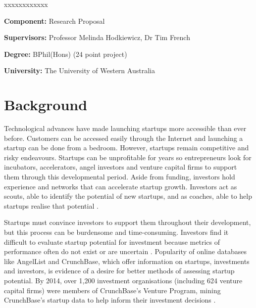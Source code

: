 \documentclass[../thesis/thesis.tex]{subfiles}
\begin{document}

\begin{namelist}{xxxxxxxxxxxx}
\item[{\bf Component:}]
    Research Proposal
\item[{\bf Supervisors:}]
    Professor Melinda Hodkiewicz, Dr Tim French
\item[{\bf Degree:}]
    BPhil(Hons) (24 point project)
\item[{\bf University:}]
    The University of Western Australia
\end{namelist}

\section*{Background}

Technological advances have made launching startups more accessible than ever before. Customers can be accessed easily through the Internet and launching a startup can be done from a bedroom. However, startups remain competitive and risky endeavours. Startups can be unprofitable for years so entrepreneurs look for incubators, accelerators, angel investors and venture capital firms to support them through this developmental period. Aside from funding, investors hold experience and networks that can accelerate startup growth. Investors act as scouts, able to identify the potential of new startups, and as coaches, able to help startups realise that potential \cite{baum2004}.

Startups must convince investors to support them throughout their development, but this process can be burdensome and time-consuming. Investors find it difficult to evaluate startup potential for investment because metrics of performance often do not exist or are uncertain \cite{shane2002}. Popularity of online databases like AngelList and CrunchBase, which offer information on startups, investments and investors, is evidence of a desire for better methods of assessing startup potential. By 2014, over 1,200 investment organisations (including 624 venture capital firms) were members of CrunchBase's Venture Program, mining CrunchBase's startup data to help inform their investment decisions \cite{patil2015}.
\end{document}
